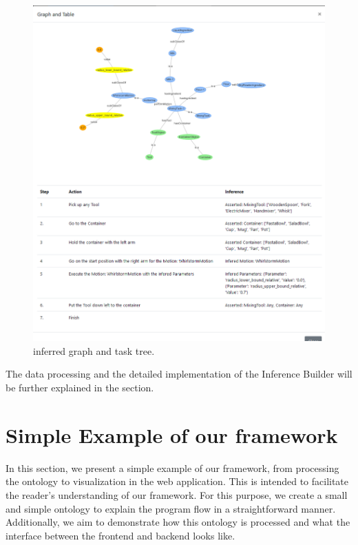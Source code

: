 \begin{figure}[H]
    \includegraphics[scale=0.5]{Graphics/new_inference_graph.png}
    \caption{inferred graph and task tree.}
    \label{fig:graph_inferred}
\end{figure}

The data processing and the detailed implementation of the Inference Builder will be further explained in the  section.

\section{Simple Example of our framework}
\label{sec:Introducing the framework with a trivial example}
In this section, we present a simple example of our framework, from processing the ontology to visualization in the web application. This is intended to facilitate the reader's understanding of our framework. For this purpose, we create a small and simple ontology to explain the program flow in a straightforward manner. Additionally, we aim to demonstrate how this ontology is processed and what the interface between the frontend and backend looks like.

